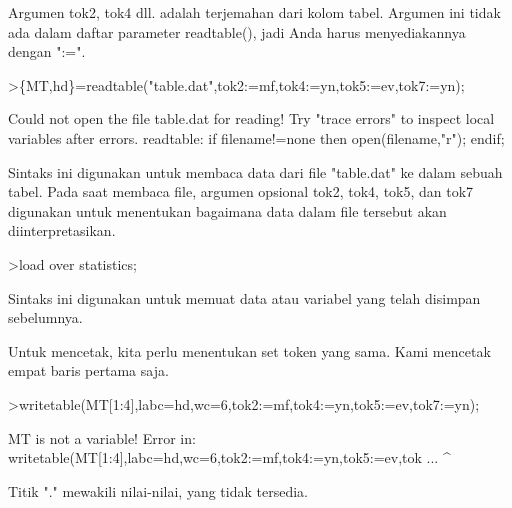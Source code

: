 \documentclass[a4paper,10pt]{article}
\begin{document}
\begin{eulernotebook}
\begin{eulercomment}
\begin{eulercomment}
\begin{eulercomment}
\begin{eulercomment}
\begin{eulercomment}
\begin{eulercomment}
\begin{eulercomment}
\begin{eulercomment}
\begin{eulercomment}
\begin{eulercomment}
\begin{eulercomment}
\begin{eulercomment}
\begin{eulercomment}
\begin{eulercomment}
\begin{eulercomment}
\begin{eulercomment}
\begin{eulercomment}
\begin{eulercomment}
\begin{eulercomment}
Argumen tok2, tok4 dll. adalah terjemahan dari kolom tabel. Argumen
ini tidak ada dalam daftar parameter readtable(), jadi Anda harus
menyediakannya dengan ":=".
\end{eulercomment}
\begin{eulerprompt}
>\{MT,hd\}=readtable("table.dat",tok2:=mf,tok4:=yn,tok5:=ev,tok7:=yn);
\end{eulerprompt}
\begin{euleroutput}
  Could not open the file
  table.dat
  for reading!
  Try "trace errors" to inspect local variables after errors.
  readtable:
      if filename!=none then open(filename,"r"); endif;
\end{euleroutput}
\begin{eulercomment}
Sintaks ini digunakan untuk membaca data dari file "table.dat" ke
dalam sebuah tabel. Pada saat membaca file, argumen opsional tok2,
tok4, tok5, dan tok7 digunakan untuk menentukan bagaimana data dalam
file tersebut akan diinterpretasikan.
\end{eulercomment}
\begin{eulerprompt}
>load over statistics;
\end{eulerprompt}
\begin{eulercomment}
Sintaks ini digunakan untuk memuat data atau variabel yang telah
disimpan sebelumnya.

Untuk mencetak, kita perlu menentukan set token yang sama. Kami
mencetak empat baris pertama saja.
\end{eulercomment}
\begin{eulerprompt}
>writetable(MT[1:4],labc=hd,wc=6,tok2:=mf,tok4:=yn,tok5:=ev,tok7:=yn);
\end{eulerprompt}
\begin{euleroutput}
  MT is not a variable!
  Error in:
  writetable(MT[1:4],labc=hd,wc=6,tok2:=mf,tok4:=yn,tok5:=ev,tok ...
                    ^
\end{euleroutput}
\begin{eulercomment}
Titik "." mewakili nilai-nilai, yang tidak tersedia.


\end{eulercomment}
\end{eulercomment}
\end{eulercomment}
\end{eulercomment}
\end{eulercomment}
\end{eulercomment}
\end{eulercomment}
\end{eulercomment}
\end{eulercomment}
\end{eulercomment}
\end{eulercomment}
\end{eulercomment}
\end{eulercomment}
\end{eulercomment}
\end{eulercomment}
\end{eulercomment}
\end{eulercomment}
\end{eulercomment}
\end{eulercomment}
\end{eulernotebook}
\end{document}
